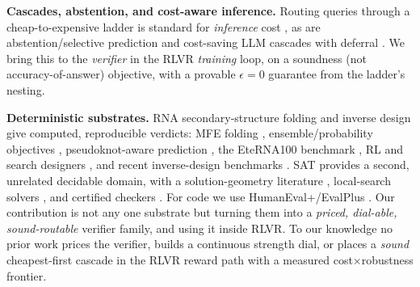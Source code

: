 \textbf{Cascades, abstention, and cost-aware inference.} Routing queries through a cheap-to-expensive ladder
is standard for \emph{inference} cost \citep{chen2024frugalgpt}, as are abstention/selective prediction
\citep{geifman2017selective} and cost-saving LLM cascades with deferral \citep{zellinger2025abstention}. We
bring this to the \emph{verifier} in the RLVR \emph{training} loop, on a soundness (not accuracy-of-answer)
objective, with a provable $\epsilon{=}0$ guarantee from the ladder's nesting.

\textbf{Deterministic substrates.} RNA secondary-structure folding and inverse design give computed,
reproducible verdicts: MFE folding \citep{lorenz2011viennarna}, ensemble/probability objectives
\citep{zadeh2011nupack}, pseudoknot-aware prediction \citep{janssen2015pkiss}, the EteRNA100 benchmark
\citep{eterna100v2}, RL and search designers \citep{runge2019learna,zhou2023samfeo,wirecki2025desirna}, and
recent inverse-design benchmarks \citep{rnainvbench,ribopo}. SAT provides a second, unrelated decidable
domain, with a solution-geometry literature \citep{zhou2008frozen,krzakala2007clustering,ardelius2008exhaustive},
local-search solvers \citep{selman1994walksat}, and certified checkers \citep{lammich2020grat,cruzfilipe2017rat}.
For code we use HumanEval+/EvalPlus \citep{evalplus}. Our contribution is not any one substrate but turning
them into a \emph{priced, dial-able, sound-routable} verifier family, and using it inside RLVR. To our
knowledge no prior work prices the verifier, builds a continuous strength dial, or places a \emph{sound}
cheapest-first cascade in the RLVR reward path with a measured cost$\times$robustness frontier.

